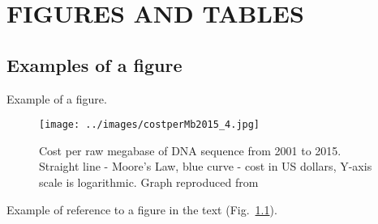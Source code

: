 \chapter{FIGURES AND TABLES}
\section{Examples of a figure}

Example of a figure.
\begin{figure}[ht!]
\begin{center}
\texttt{[image: ../images/costperMb2015\_4.jpg]}
\end{center}
\caption[hehe]{Cost per raw megabase of DNA sequence from 2001 to 2015. Straight line - Moore's Law, blue curve - cost in US dollars, Y-axis scale is logarithmic. Graph reproduced from \cite{wetterstrand2016}}
\label{fig_dna_cost}
\end{figure}

Example of reference to a figure in the text (Fig.~\ref{fig_dna_cost}).


